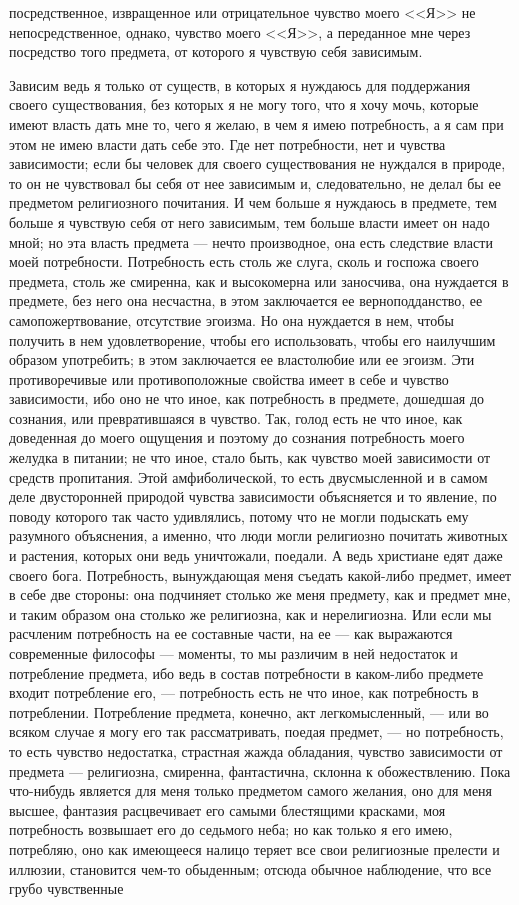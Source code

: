 \documentclass[12pt]{article}
\begin{document}
посредственное, извращенное или отрицательное чувство моего <<Я>>  не непосредственное, однако, чувство моего <<Я>>, а переданное мне через посредство того предмета, от которого я чувствую себя зависимым. 

Зависим ведь я только от существ, в которых я нуждаюсь для поддержания своего существования, без которых я не могу того, что я хочу мочь, которые имеют власть дать мне то, чего я желаю, в чем я имею потребность, а я сам при этом не имею власти дать себе это. Где нет потребности, нет и чувства зависимости; если бы человек для своего существования не нуждался в природе, то он не чувствовал бы себя от нее зависимым и, следовательно, не делал бы ее предметом религиозного почитания. И чем больше я нуждаюсь в предмете, тем больше я чувствую себя от него зависимым, тем больше власти имеет он надо мной; но эта власть предмета --- нечто производное, она есть следствие власти моей потребности. Потребность есть столь же слуга, сколь и госпожа своего предмета, столь же смиренна, как и высокомерна или заносчива, она нуждается в предмете, без него она несчастна, в этом заключается ее верноподданство, ее самопожертвование, отсутствие эгоизма. Но она нуждается в нем, чтобы получить в нем удовлетворение, чтобы его использовать, чтобы его наилучшим образом употребить; в этом заключается ее властолюбие или ее эгоизм. Эти противоречивые или противоположные свойства имеет в себе и чувство зависимости, ибо оно не что иное, как потребность в предмете, дошедшая до сознания, или превратившаяся в чувство. Так, голод есть не что иное, как доведенная до моего ощущения и поэтому до сознания потребность моего желудка в питании; не что иное, стало быть, как чувство моей зависимости от средств пропитания. Этой амфиболической, то есть двусмысленной и в самом деле двусторонней природой чувства зависимости объясняется и то явление, по поводу которого так часто удивлялись, потому что не могли подыскать ему разумного объяснения, а именно, что люди могли религиозно почитать животных и растения, которых они ведь уничтожали, поедали. А ведь христиане едят даже своего бога. Потребность, вынуждающая меня съедать какой-либо предмет, имеет в себе две стороны: она подчиняет столько же меня предмету, как и предмет мне, и таким образом она столько же религиозна, как и нерелигиозна. Или если мы расчленим потребность на ее составные части, на ее --- как выражаются современные философы --- моменты, то мы различим в ней недостаток и потребление предмета, ибо ведь в состав потребности в каком-либо предмете входит потребление его, --- потребность есть не что иное, как потребность в потреблении. Потребление предмета, конечно, акт легкомысленный, --- или во всяком случае я могу его так рассматривать, поедая предмет, --- но потребность, то есть чувство недостатка, страстная жажда обладания, чувство зависимости от предмета --- религиозна, смиренна, фантастична, склонна к обожествлению. Пока что-нибудь является для меня только предметом самого желания, оно для меня высшее, фантазия расцвечивает его самыми блестящими красками, моя потребность возвышает его до седьмого неба; но как только я его имею, потребляю, оно как имеющееся налицо теряет все свои религиозные прелести и иллюзии, становится чем-то обыденным; отсюда обычное наблюдение, что все грубо чувственные 
\end{document}
